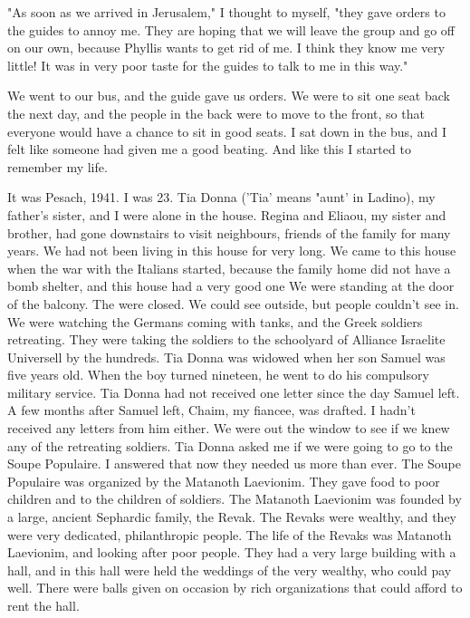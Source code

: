 "As soon as we arrived in Jerusalem," I thought to myself, "they gave orders to the guides to annoy me.
They are hoping that we will leave the group and go off on our own, because Phyllis wants to get rid of me.
I think they know me very little!
It was  in very poor taste for the guides to talk to me in this way."

We went to our bus, and the guide gave us orders.
We were to sit one seat back the next day, and the people in the back were to move to the front, so that everyone would have a chance to sit in good seats.
I sat down in the bus, and I felt like someone had given me a good beating. And like this I started to remember my life. 


It was Pesach, 1941.
I was 23.
Tia Donna ('Tia' means "aunt'  in Ladino), my father's sister, and I were alone in the house.
Regina and Eliaou, my sister and brother, had gone downstairs to visit neighbours, friends of the family for many years.
We had not been living in this house for very long.
We came to this house when the war with the Italians started, because the family home did not have a bomb shelter, and this house had a very good one
We were standing at the door of the balcony.
The were closed.
We could see outside, but people couldn't see in.
We were watching the Germans coming with tanks, and the Greek soldiers retreating.
They were taking the soldiers to the schoolyard of Alliance Israelite Universell by the hundreds. 
Tia Donna was widowed when her son Samuel was five years old. 
When the boy turned nineteen, he went to do his compulsory military service.
Tia Donna had not received one letter since the day Samuel left.
A few months after Samuel left, Chaim, my fiancee, was drafted.
I hadn't received any letters from him either.
We were out the window to see if we knew any of the retreating soldiers.
Tia Donna asked me if we were going to go to the Soupe Populaire. 
I answered that now they needed us more than ever.
The Soupe Populaire was organized by the Matanoth Laevionim.
They gave food to  poor children and to the children of soldiers.
The Matanoth Laevionim was founded by a large, ancient Sephardic family, the Revak. 
The Revaks were wealthy, and they were very dedicated, philanthropic people.
The life of the Revaks was Matanoth Laevionim, and looking after poor people.
They had a very large building with a hall, and 
in this hall were held the weddings of the very wealthy, who could pay well.
There were balls given on occasion by rich organizations that could afford to rent the hall.
